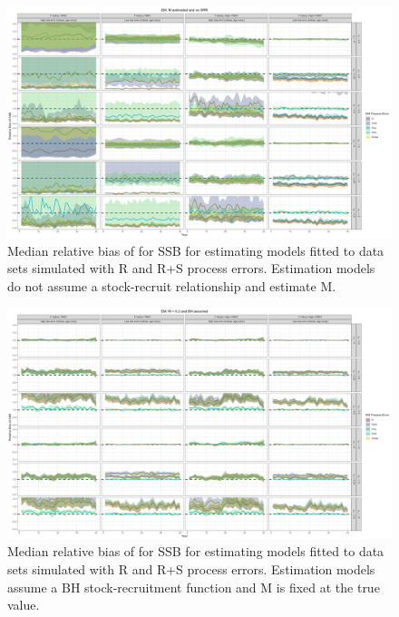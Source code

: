 \documentclass[
  12pt,
]{article}
\begin{document}
\begin{landscape}
\begin{figure}
\caption{Median relative bias of for SSB for estimating models fitted to data sets simulated with R and R+S process errors. Estimation models do not assume a stock-recruit relationship and estimate M.}\label{naa_om_em_R_ME_relbias_ssb}
\begin{center}
\includegraphics[width = \textwidth]{naa_om_R_ME_relbias_ssb.png}
\end{center}
\end{figure}
\end{landscape}

\begin{landscape}
\begin{figure}
\caption{Median relative bias of for SSB for estimating models fitted to data sets simulated with R and R+S process errors. Estimation models assume a BH stock-recruitment function and M is fixed at the true value.}\label{naa_om_em_BH_MF_relbias_ssb}
\begin{center}
\includegraphics[width = \textwidth]{naa_om_BH_MF_relbias_ssb.png}
\end{center}
\end{figure}
\end{landscape}
\end{document}
